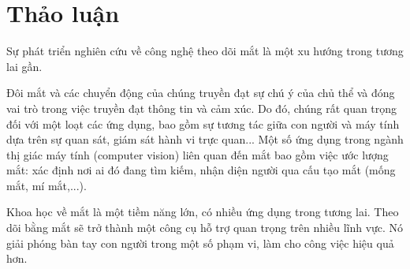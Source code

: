 \chapter{Thảo luận}
    Sự phát triển nghiên cứu về công nghệ theo dõi mắt là một xu hướng trong tương lai gần.
    
	Đôi mắt và các chuyển động của chúng truyền đạt sự chú ý của chủ thể và đóng vai trò trong việc truyền đạt thông tin và cảm xúc. Do đó, chúng rất quan trọng đối với một loạt các ứng dụng, bao gồm sự tương tác giữa con người và máy tính dựa trên sự quan sát, giám sát hành vi trực quan... Một số ứng dụng trong ngành thị giác máy tính (computer vision) liên quan đến mắt bao gồm việc ước lượng mắt: xác định nơi ai đó đang tìm kiếm, nhận diện người qua cấu tạo mắt (mống mắt, mí mắt,...).
	
	Khoa học về mắt là một tiềm năng lớn, có nhiều ứng dụng trong tương lai. Theo dõi bằng mắt sẽ trở thành một công cụ hỗ trợ quan trọng trên nhiều lĩnh vực. Nó giải phóng bàn tay con người trong một số phạm vi, làm cho công việc hiệu quả hơn.